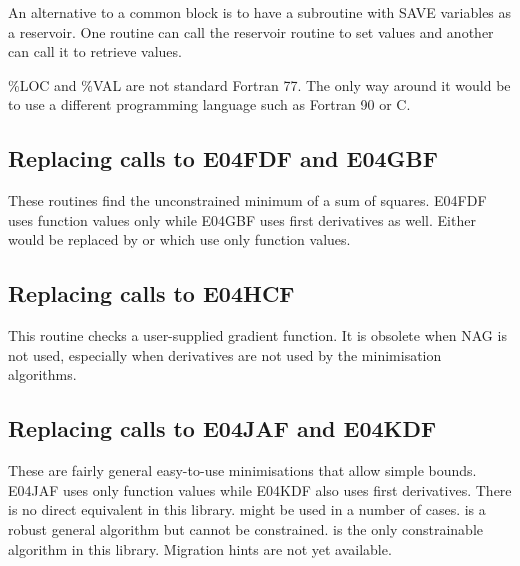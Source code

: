    An alternative to a common block is to have a subroutine with SAVE
   variables as a reservoir. One routine can call the reservoir routine
   to set values and another can call it to retrieve values.

   \%LOC and \%VAL are not standard Fortran 77. The only way around it
   would be to use a different programming language such as Fortran 90
   or C.


\subsection{Replacing calls to E04FDF and E04GBF}

   These routines find the unconstrained minimum of a sum of squares.
   E04FDF uses function values only while E04GBF uses first derivatives
   as well. Either would be replaced by
   or
   which use only function values.


\subsection{Replacing calls to E04HCF}

   This routine checks a user-supplied gradient function. It is obsolete
   when NAG is not used, especially when derivatives are not used by the
   minimisation algorithms.


\subsection{Replacing calls to E04JAF and E04KDF}

   These are fairly general easy-to-use minimisations that allow simple
   bounds. E04JAF uses only function values while E04KDF also uses first
   derivatives. There is no direct equivalent in this library.
   might
   be used in a number of cases.
   is a
   robust general algorithm but cannot be constrained.
   is the only constrainable algorithm in this library.
   Migration hints are not yet available.

